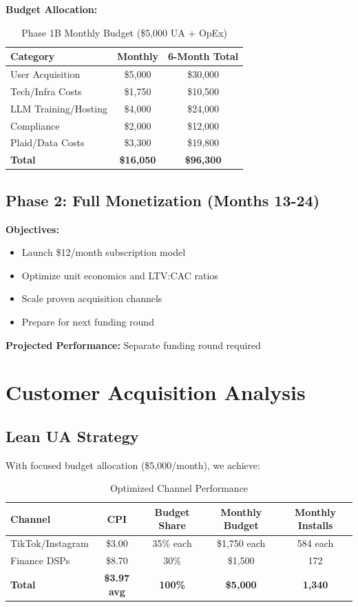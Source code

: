 \documentclass[11pt,letterpaper]{article}
\begin{document}
\textbf{Budget Allocation:}
\begin{table}[h]
\centering
\caption{Phase 1B Monthly Budget (\$5,000 UA + OpEx)}
\begin{tabular}{|l|c|c|}
\hline
\textbf{Category} & \textbf{Monthly} & \textbf{6-Month Total} \\
\hline
User Acquisition & \$5,000 & \$30,000 \\
Tech/Infra Costs & \$1,750 & \$10,500 \\
LLM Training/Hosting & \$4,000 & \$24,000 \\
Compliance & \$2,000 & \$12,000 \\
Plaid/Data Costs & \$3,300 & \$19,800 \\
\textbf{Total} & \textbf{\$16,050} & \textbf{\$96,300} \\
\hline
\end{tabular}
\end{table}

\subsection{Phase 2: Full Monetization (Months 13-24)}

\textbf{Objectives:}
\begin{itemize}
\item Launch \$12/month subscription model
\item Optimize unit economics and LTV:CAC ratios
\item Scale proven acquisition channels
\item Prepare for next funding round
\end{itemize}

\textbf{Projected Performance:} Separate funding round required

\newpage

\section{Customer Acquisition Analysis}

\subsection{Lean UA Strategy}

With focused budget allocation (\$5,000/month), we achieve:

\begin{table}[h]
\centering
\caption{Optimized Channel Performance}
\begin{tabular}{|l|c|c|c|c|}
\hline
\textbf{Channel} & \textbf{CPI} & \textbf{Budget Share} & \textbf{Monthly Budget} & \textbf{Monthly Installs} \\
\hline
TikTok/Instagram & \$3.00 & 35\% each & \$1,750 each & 584 each \\
Finance DSPs & \$8.70 & 30\% & \$1,500 & 172 \\
\textbf{Total} & \textbf{\$3.97 avg} & \textbf{100\%} & \textbf{\$5,000} & \textbf{1,340} \\
\hline
\end{tabular}
\end{table}
\end{document}
